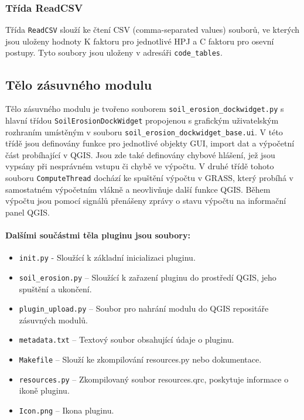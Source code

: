 \subsubsection{Třída ReadCSV}
Třída \texttt{ReadCSV} slouží ke čtení CSV (comma-separated values) souborů, ve kterých jsou uloženy hodnoty K faktoru pro jednotlivé HPJ a C faktoru pro osevní postupy. Tyto soubory jsou uloženy v adresáři \texttt{code\_tables}. 

\subsection{Tělo zásuvného modulu}
Tělo zásuvného modulu je tvořeno souborem \texttt{soil\_erosion\_dockwidget.py} s hlavní třídou \texttt{SoilErosionDockWidget} propojenou s grafickým uživatelským rozhraním umístěným v souboru \texttt{soil\_erosion\_dockwidget\_base.ui}. V této třídě jsou definovány funkce pro jednotlivé objekty GUI, import dat a výpočetní část probíhající v QGIS. Jsou zde také definovány chybové hlášení, jež jsou vypsány při nesprávném vstupu či chybě ve výpočtu. V druhé třídě tohoto souboru \texttt{ComputeThread} dochází ke spuštění výpočtu v GRASS, který probíhá v samostatném výpočetním vlákně a neovlivňuje další funkce QGIS. Během výpočtu jsou pomocí signálů přenášeny zprávy o stavu výpočtu na informační panel QGIS. 

\paragraph{Dalšími součástmi těla pluginu jsou soubory:}
\begin{itemize}
	\item \texttt{init.py} - Sloužící k základní inicializaci pluginu.
	\item \texttt{soil\_erosion.py} – Sloužící k zařazení pluginu do prostředí QGIS, jeho spuštění a ukončení.
	\item \texttt{plugin\_upload.py} – Soubor pro nahrání modulu do QGIS repositáře zásuvných modulů.
	\item \texttt{metadata.txt} – Textový soubor obsahující údaje o pluginu.
	\item \texttt{Makefile} – Slouží ke zkompilování resources.py nebo dokumentace.
	\item \texttt{resources.py} – Zkompilovaný soubor resources.qrc, poskytuje informace o ikoně pluginu.
	\item \texttt{Icon.png} – Ikona pluginu.
\end{itemize}
\newpage
